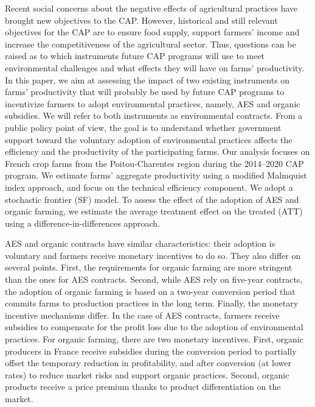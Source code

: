 \begin{Article}
\begin{refsection}[Lassalas]
Recent social concerns about the negative effects of agricultural
practices have brought new objectives to the CAP. However, historical
and still relevant objectives for the CAP are to ensure food supply,
support farmers' income and increase the competitiveness of the
agricultural sector. Thus, questions can be raised as to which
instruments future CAP programs will use to meet environmental
challenges and what effects they will have on farms' productivity. In
this paper, we aim at assessing the impact of two existing instruments
on farms' productivity that will probably be used by future CAP programs
to incentivize farmers to adopt environmental practices, namely, AES and
organic subsidies. We will refer to both instruments as environmental
contracts. From a public policy point of view, the goal is to understand
whether government support toward the voluntary adoption of
environmental practices affects the efficiency and the productivity of
the participating farms. Our analysis focuses on French crop farms from
the Poitou-Charentes region during the 2014--2020 CAP program. We
estimate farms' aggregate productivity using a modified Malmquist index
approach, and focus on the technical efficiency component. We adopt a
stochastic frontier (SF) model. To assess the effect of the adoption of
AES and organic farming, we estimate the average treatment effect on the
treated (ATT) using a difference-in-differences approach.

AES and organic contracts have similar characteristics: their adoption
is voluntary and farmers receive monetary incentives to do so. They also
differ on several points. First, the requirements for organic farming
are more stringent than the ones for AES contracts. Second, while AES
rely on five-year contracts, the adoption of organic farming is based on
a two-year conversion period that commits farms to production practices
in the long term. Finally, the monetary incentive mechanisms differ. In
the case of AES contracts, farmers receive subsidies to compensate for
the profit loss due to the adoption of environmental practices. For
organic farming, there are two monetary incentives. First, organic
producers in France receive subsidies during the conversion period to
partially offset the temporary reduction in profitability, and after
conversion (at lower rates) to reduce market risks and support organic
practices. Second, organic products receive a price premium thanks to
product differentiation on the market.


\end{refsection}
\end{Article}
